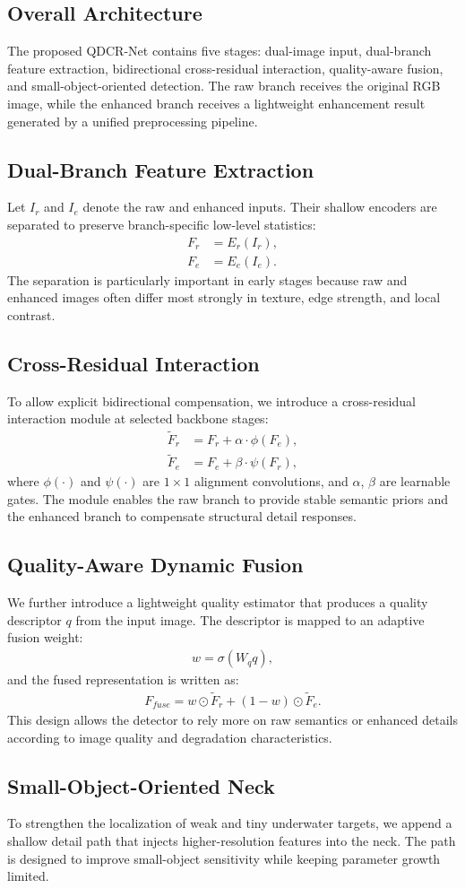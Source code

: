 \subsection*{Overall Architecture}
The proposed QDCR-Net contains five stages: dual-image input, dual-branch feature
extraction, bidirectional cross-residual interaction, quality-aware fusion, and
small-object-oriented detection. The raw branch receives the original RGB image, while the
enhanced branch receives a lightweight enhancement result generated by a unified preprocessing
pipeline.

\subsection*{Dual-Branch Feature Extraction}
Let $I_r$ and $I_e$ denote the raw and enhanced inputs. Their shallow encoders are separated
to preserve branch-specific low-level statistics:
\begin{align}
F_r &= E_r(I_r), \\
F_e &= E_e(I_e).
\end{align}
The separation is particularly important in early stages because raw and enhanced images
often differ most strongly in texture, edge strength, and local contrast.

\subsection*{Cross-Residual Interaction}
To allow explicit bidirectional compensation, we introduce a cross-residual interaction
module at selected backbone stages:
\begin{align}
\tilde{F}_r &= F_r + \alpha \cdot \phi(F_e), \\
\tilde{F}_e &= F_e + \beta \cdot \psi(F_r),
\end{align}
where $\phi(\cdot)$ and $\psi(\cdot)$ are $1 \times 1$ alignment convolutions, and
$\alpha$, $\beta$ are learnable gates. The module enables the raw branch to provide stable
semantic priors and the enhanced branch to compensate structural detail responses.

\subsection*{Quality-Aware Dynamic Fusion}
We further introduce a lightweight quality estimator that produces a quality descriptor
$q$ from the input image. The descriptor is mapped to an adaptive fusion weight:
\begin{align}
w = \sigma(W_q q),
\end{align}
and the fused representation is written as:
\begin{align}
F_{fuse} = w \odot \tilde{F}_r + (1 - w) \odot \tilde{F}_e.
\end{align}
This design allows the detector to rely more on raw semantics or enhanced details according
to image quality and degradation characteristics.

\subsection*{Small-Object-Oriented Neck}
To strengthen the localization of weak and tiny underwater targets, we append a shallow
detail path that injects higher-resolution features into the neck. The path is designed to
improve small-object sensitivity while keeping parameter growth limited.
